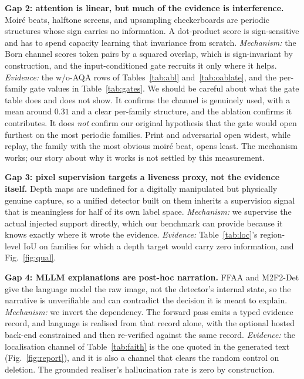 \documentclass[conference]{IEEEtran}
\begin{document}
\textbf{Gap 2: attention is linear, but much of the evidence is interference.}
Moir\'e beats, halftone screens, and upsampling checkerboards are periodic structures
whose sign carries no information. A dot-product score is sign-sensitive and has to
spend capacity learning that invariance from scratch. \emph{Mechanism:} the Born
channel scores token pairs by a squared overlap, which is sign-invariant by
construction, and the input-conditioned gate recruits it only where it helps.
\emph{Evidence:} the w/o-AQA rows of Tables~\ref{tab:abl} and~\ref{tab:oablate}, and
the per-family gate values in Table~\ref{tab:gates}. We should be careful about what
the gate table does and does not show. It confirms the channel is genuinely used,
with a mean around $0.31$ and a clear per-family structure, and the ablation confirms
it contributes. It does \emph{not} confirm our original hypothesis that the gate
would open furthest on the most periodic families. Print and adversarial open widest,
while replay, the family with the most obvious moir\'e beat, opens least. The
mechanism works; our story about why it works is not settled by this measurement.

\textbf{Gap 3: pixel supervision targets a liveness proxy, not the evidence itself.}
Depth maps \cite{liu2018auxiliary,yu2021revisiting} are undefined for a digitally
manipulated but physically genuine capture, so a unified detector built on them
inherits a supervision signal that is meaningless for half of its own label space.
\emph{Mechanism:} we supervise the actual injected support directly, which our
benchmark can provide because it knows exactly where it wrote the evidence.
\emph{Evidence:} Table~\ref{tab:loc}'s region-level IoU on families for which a depth
target would carry zero information, and Fig.~\ref{fig:qual}.

\textbf{Gap 4: MLLM explanations are post-hoc narration.} FFAA \cite{huang2024ffaa}
and M2F2-Det \cite{guo2025m2f2det} give the language model the raw image, not the
detector's internal state, so the narrative is unverifiable and can contradict the
decision it is meant to explain. \emph{Mechanism:} we invert the dependency. The
forward pass emits a typed evidence record, and language is realised from that record
alone, with the optional hosted back-end constrained and then re-verified against the
same record. \emph{Evidence:} the localisation channel of Table~\ref{tab:faith} is
the one quoted in the generated text (Fig.~\ref{fig:report}), and it is also a channel
that clears the random control on deletion. The grounded realiser's hallucination
rate is zero by construction.
\end{document}
